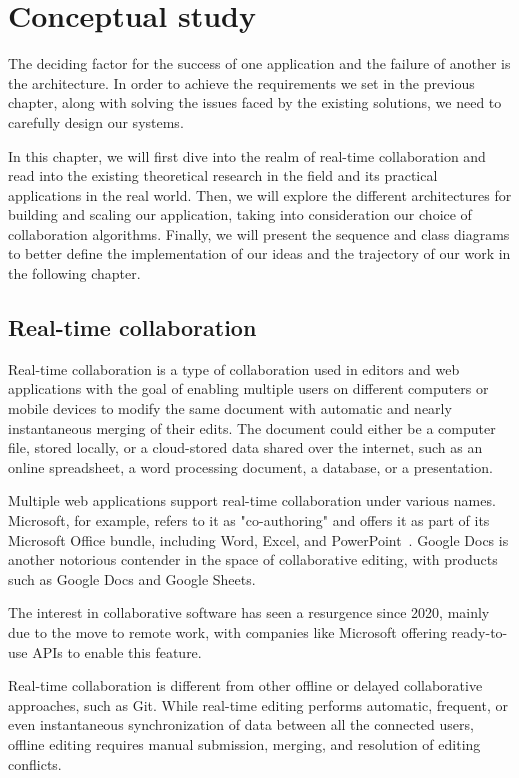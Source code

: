 \chapter{Conceptual study}
\label{chap:conceptual}

\begin{toexclude}
The deciding factor for the success of one application and the failure of another is the architecture.
In order to achieve the requirements we set in the previous chapter, along with solving the issues faced by the existing solutions, we need to carefully design our systems.

In this chapter, we will first dive into the realm of real-time collaboration and read into the existing theoretical research in the field and its practical applications in the real world.
Then, we will explore the different architectures for building and scaling our application, taking into consideration our choice of collaboration algorithms.
Finally, we will present the sequence and class diagrams to better define the implementation of our ideas and the trajectory of our work in the following chapter.

\section{Real-time collaboration}

Real-time collaboration is a type of collaboration used in editors and web applications with the goal of enabling multiple users on different computers or mobile devices to modify the same document with automatic and nearly instantaneous merging of their edits.
The document could either be a computer file, stored locally, or a cloud-stored data shared over the internet, such as an online spreadsheet, a word processing document, a database, or a presentation.

Multiple web applications support real-time collaboration under various names.
Microsoft, for example, refers to it as "co-authoring" and offers it as part of its Microsoft Office bundle, including Word, Excel, and PowerPoint~\autocite{noauthor_document_nodate}.
Google Docs is another notorious contender in the space of collaborative editing, with products such as Google Docs and Google Sheets.

The interest in collaborative software has seen a resurgence since 2020, mainly due to the move to remote work, with companies like Microsoft offering ready-to-use APIs to enable this feature.

Real-time collaboration is different from other offline or delayed collaborative approaches, such as Git.
While real-time editing performs automatic, frequent, or even instantaneous synchronization of data between all the connected users, offline editing requires manual submission, merging, and resolution of editing conflicts.


\end{toexclude}
